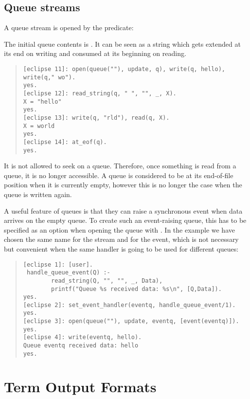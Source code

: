 \subsection{Queue streams}
\label{queueio}
A queue stream is opened by the
 predicate:
\begin{quote}
\end{quote}
The initial queue contents is .
It can be seen as a string which gets extended at its end on writing
and consumed at its beginning on reading.
\begin{quote}
\begin{verbatim}
[eclipse 11]: open(queue(""), update, q), write(q, hello), write(q," wo").
yes.
[eclipse 12]: read_string(q, " ", "", _, X).
X = "hello"
yes.
[eclipse 13]: write(q, "rld"), read(q, X).
X = world
yes.
[eclipse 14]: at_eof(q).
yes.
\end{verbatim}
\end{quote}
It is not allowed to seek on a queue. Therefore, once something is read
from a queue, it is no longer accessible. A queue is considered to be
at its end-of-file position when it is currently empty, however this
is no longer the case when the queue is written again.

A useful feature of queues is that they can raise a synchronous event
when data arrives on the empty queue. To create such an event-raising
queue, this has to be specified as an option when opening the queue with
.
In the example we have chosen the same name for the stream and for the
event, which is not necessary but convenient when the same handler
is going to be used for different queues:
\begin{quote}
\begin{verbatim}
[eclipse 1]: [user].
 handle_queue_event(Q) :-
        read_string(Q, "", "", _, Data),
        printf("Queue %s received data: %s\n", [Q,Data]).
yes.
[eclipse 2]: set_event_handler(eventq, handle_queue_event/1).
yes.
[eclipse 3]: open(queue(""), update, eventq, [event(eventq)]).
yes.
[eclipse 4]: write(eventq, hello).
Queue eventq received data: hello
yes.
\end{verbatim}
\end{quote}


\section{Term Output Formats}
\label{secoutputformats}

